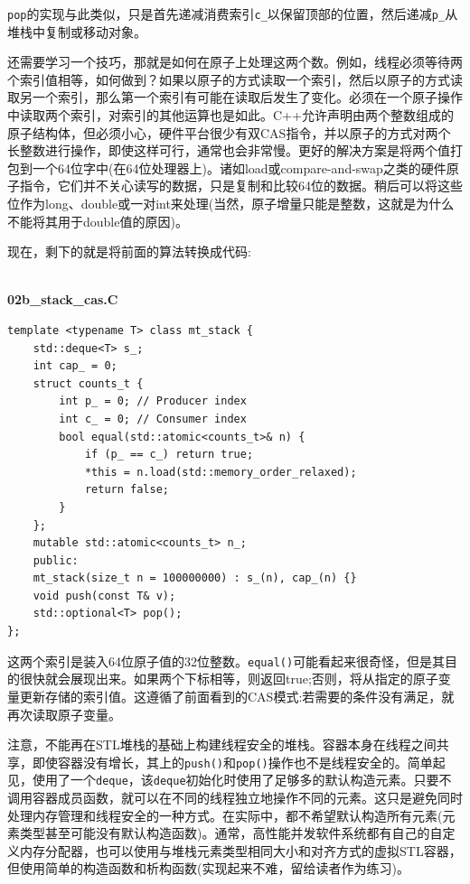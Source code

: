 \texttt{pop}的实现与此类似，只是首先递减消费索引\texttt{c\_}以保留顶部的位置，然后递减\texttt{p\_}从堆栈中复制或移动对象。

还需要学习一个技巧，那就是如何在原子上处理这两个数。例如，线程必须等待两个索引值相等，如何做到？如果以原子的方式读取一个索引，然后以原子的方式读取另一个索引，那么第一个索引有可能在读取后发生了变化。必须在一个原子操作中读取两个索引，对索引的其他运算也是如此。C++允许声明由两个整数组成的原子结构体，但必须小心，硬件平台很少有双CAS指令，并以原子的方式对两个长整数进行操作，即使这样可行，通常也会非常慢。更好的解决方案是将两个值打包到一个64位字中(在64位处理器上)。诸如load或compare-and-swap之类的硬件原子指令，它们并不关心读写的数据，只是复制和比较64位的数据。稍后可以将这些位作为long、double或一对int来处理(当然，原子增量只能是整数，这就是为什么不能将其用于double值的原因)。

现在，剩下的就是将前面的算法转换成代码:

\hspace*{\fill} \\ %
\noindent
\textbf{02b\_stack\_cas.C}
\begin{lstlisting}[style=styleCXX]
template <typename T> class mt_stack {
	std::deque<T> s_;
	int cap_ = 0;
	struct counts_t {
		int p_ = 0; // Producer index
		int c_ = 0; // Consumer index
		bool equal(std::atomic<counts_t>& n) {
			if (p_ == c_) return true;
			*this = n.load(std::memory_order_relaxed);
			return false;
		}
	};
	mutable std::atomic<counts_t> n_;
	public:
	mt_stack(size_t n = 100000000) : s_(n), cap_(n) {}
	void push(const T& v);
	std::optional<T> pop();
};
\end{lstlisting}

这两个索引是装入64位原子值的32位整数。\texttt{equal()}可能看起来很奇怪，但是其目的很快就会展现出来。如果两个下标相等，则返回true;否则，将从指定的原子变量更新存储的索引值。这遵循了前面看到的CAS模式:若需要的条件没有满足，就再次读取原子变量。

注意，不能再在STL堆栈的基础上构建线程安全的堆栈。容器本身在线程之间共享，即使容器没有增长，其上的\texttt{push()}和\texttt{pop()}操作也不是线程安全的。简单起见，使用了一个\texttt{deque}，该\texttt{deque}初始化时使用了足够多的默认构造元素。只要不调用容器成员函数，就可以在不同的线程独立地操作不同的元素。这只是避免同时处理内存管理和线程安全的一种方式。在实际中，都不希望默认构造所有元素(元素类型甚至可能没有默认构造函数)。通常，高性能并发软件系统都有自己的自定义内存分配器，也可以使用与堆栈元素类型相同大小和对齐方式的虚拟STL容器，但使用简单的构造函数和析构函数(实现起来不难，留给读者作为练习)。

